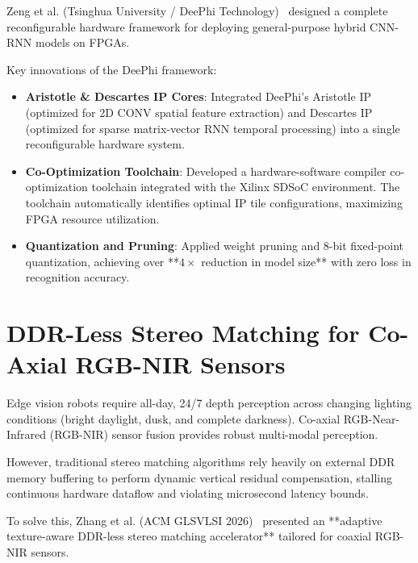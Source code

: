Zeng et al. (Tsinghua University / DeePhi Technology)~\cite{zeng2018efficient} designed a complete reconfigurable hardware framework for deploying general-purpose hybrid CNN-RNN models on FPGAs.

Key innovations of the DeePhi framework:
\begin{itemize}[leftmargin=*]
    \item \textbf{Aristotle \& Descartes IP Cores}: Integrated DeePhi's Aristotle IP (optimized for 2D CONV spatial feature extraction) and Descartes IP (optimized for sparse matrix-vector RNN temporal processing) into a single reconfigurable hardware system.
    \item \textbf{Co-Optimization Toolchain}: Developed a hardware-software compiler co-optimization toolchain integrated with the Xilinx SDSoC environment. The toolchain automatically identifies optimal IP tile configurations, maximizing FPGA resource utilization.
    \item \textbf{Quantization and Pruning}: Applied weight pruning and 8-bit fixed-point quantization, achieving over **$4\times$ reduction in model size** with zero loss in recognition accuracy.
\end{itemize}

\section{DDR-Less Stereo Matching for Co-Axial RGB-NIR Sensors}
Edge vision robots require all-day, 24/7 depth perception across changing lighting conditions (bright daylight, dusk, and complete darkness). Co-axial RGB-Near-Infrared (RGB-NIR) sensor fusion provides robust multi-modal perception.

However, traditional stereo matching algorithms rely heavily on external DDR memory buffering to perform dynamic vertical residual compensation, stalling continuous hardware dataflow and violating microsecond latency bounds.

To solve this, Zhang et al. (ACM GLSVLSI 2026)~\cite{zhang2026fpga} presented an **adaptive texture-aware DDR-less stereo matching accelerator** tailored for coaxial RGB-NIR sensors.

